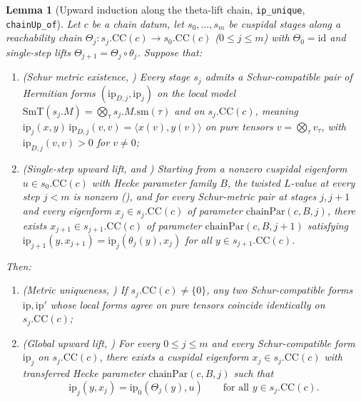 \documentclass[11pt]{amsart}
\theoremstyle{plain}
\newtheorem{lemma}[theorem]{Lemma}
\theoremstyle{definition}
\numberwithin{equation}{section}
\begin{document}
\begin{lemma}[Upward induction along the theta-lift chain, \texttt{ip\_unique}, \texttt{chainUp\_of}]\label{lem:thetachain}
Let $c$ be a chain datum, let $s_0,\dots,s_m$ be cuspidal stages along a reachability chain
$\Theta_j:s_j.\mathrm{CC}(c)\to s_0.\mathrm{CC}(c)$ ($0\le j\le m$) with $\Theta_0=\mathrm{id}$
and single-step lifts $\Theta_{j+1}=\Theta_j\circ\theta_j$. Suppose that:
\begin{enumerate}[label=(\alph*)]
\item \textup{(Schur metric existence, )} Every stage $s_j$ admits a Schur-compatible
  pair of Hermitian forms $(\mathrm{ip}_{D,j},\mathrm{ip}_j)$ on the local model
  $\mathrm{SmT}(s_j.M)=\bigotimes_\tau s_j.M.\mathrm{sm}(\tau)$ and on $s_j.\mathrm{CC}(c)$,
  meaning $\mathrm{ip}_j(x,y)\,\mathrm{ip}_{D,j}(v,v)=\langle x(v),y(v)\rangle$ on pure tensors
  $v=\bigotimes_\tau v_\tau$, with $\mathrm{ip}_{D,j}(v,v)>0$ for $v\neq 0$;
\item \textup{(Single-step upward lift,  and )} Starting from a nonzero
  cuspidal eigenform $u\in s_0.\mathrm{CC}(c)$ with Hecke parameter family $B$, the twisted
  $L$-value at every step $j<m$ is nonzero (), and for every Schur-metric pair at stages
  $j,j+1$ and every eigenform $x_j\in s_j.\mathrm{CC}(c)$ of parameter $\mathrm{chainPar}(c,B,j)$,
  there exists $x_{j+1}\in s_{j+1}.\mathrm{CC}(c)$ of parameter $\mathrm{chainPar}(c,B,j+1)$
  satisfying $\mathrm{ip}_{j+1}(y,x_{j+1})=\mathrm{ip}_j(\theta_j(y),x_j)$ for all
  $y\in s_{j+1}.\mathrm{CC}(c)$.
\end{enumerate}
Then:
\begin{enumerate}[label=(\roman*)]
\item \textup{(Metric uniqueness, )} If $s_j.\mathrm{CC}(c)\neq\{0\}$, any two
  Schur-compatible forms $\mathrm{ip},\mathrm{ip}'$ whose local forms agree on pure tensors coincide
  identically on $s_j.\mathrm{CC}(c)$;
\item \textup{(Global upward lift, )} For every
  $0\le j\le m$ and every Schur-compatible form $\mathrm{ip}_j$ on $s_j.\mathrm{CC}(c)$, there
  exists a cuspidal eigenform $x_j\in s_j.\mathrm{CC}(c)$ with transferred Hecke parameter
  $\mathrm{chainPar}(c,B,j)$ such that
  \[
  \mathrm{ip}_j(y,x_j)=\mathrm{ip}_0(\Theta_j(y),u)\qquad\text{for all } y\in s_j.\mathrm{CC}(c).
  \]
\end{enumerate}
\end{lemma}
\end{document}
